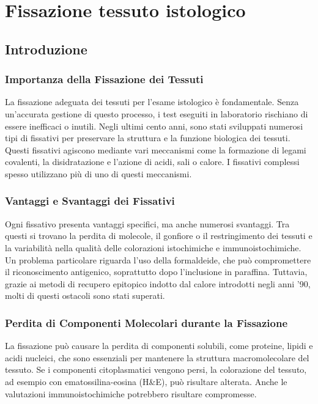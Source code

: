\chapter{Fissazione tessuto istologico}

\section{Introduzione}


\subsection{Importanza della Fissazione dei Tessuti}
La fissazione adeguata dei tessuti per l'esame istologico è fondamentale. Senza un'accurata gestione di questo processo, i test eseguiti in laboratorio rischiano di essere inefficaci o inutili. Negli ultimi cento anni, sono stati sviluppati numerosi tipi di fissativi per preservare la struttura e la funzione biologica dei tessuti. Questi fissativi agiscono mediante vari meccanismi come la formazione di legami covalenti, la disidratazione e l'azione di acidi, sali o calore. I fissativi complessi spesso utilizzano più di uno di questi meccanismi.

\subsection{Vantaggi e Svantaggi dei Fissativi}
Ogni fissativo presenta vantaggi specifici, ma anche numerosi svantaggi. Tra questi si trovano la perdita di molecole, il gonfiore o il restringimento dei tessuti e la variabilità nella qualità delle colorazioni istochimiche e immunoistochimiche. Un problema particolare riguarda l'uso della formaldeide, che può compromettere il riconoscimento antigenico, soprattutto dopo l'inclusione in paraffina. Tuttavia, grazie ai metodi di recupero epitopico indotto dal calore introdotti negli anni '90, molti di questi ostacoli sono stati superati.

\subsection{Perdita di Componenti Molecolari durante la Fissazione}
La fissazione può causare la perdita di componenti solubili, come proteine, lipidi e acidi nucleici, che sono essenziali per mantenere la struttura macromolecolare del tessuto. Se i componenti citoplasmatici vengono persi, la colorazione del tessuto, ad esempio con ematossilina-eosina (H\&E), può risultare alterata. Anche le valutazioni immunoistochimiche potrebbero risultare compromesse.

